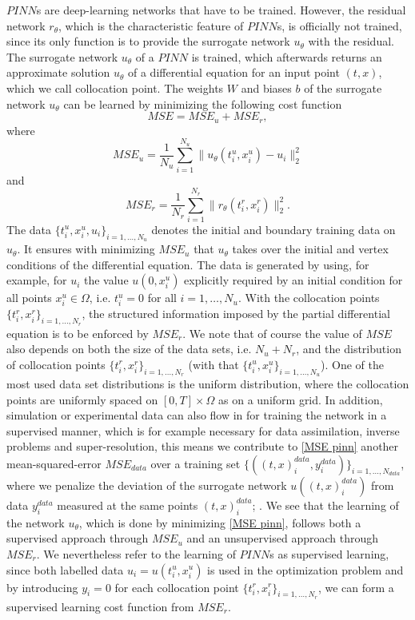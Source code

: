 $PINN$s are deep-learning networks that have to be trained. However, the residual network $r_\theta$, which is the characteristic feature of $PINN$s, is officially not trained, since its only function is to provide the surrogate network $u_\theta$ with the residual. The surrogate network $u_\theta$ of a $PINN$ is trained, which afterwards returns an approximate solution $u_\theta$ of a differential equation for an input point $(t,x)$, which we call collocation point. The weights $W$ and biases $b$ of the surrogate network $u_\theta$ can be learned by minimizing the following cost function
\begin{equation}
    \label{MSE pinn}
    MSE = MSE_u + MSE_r, 
\end{equation}
where
\begin{equation*}
    MSE_u = \frac{1}{N_u} \sum^{N_u}_{i = 1} \lVert u_\theta(t^{u}_i, x^{u}_i) - u_i \rVert^{2}_{2}
\end{equation*}
and
\begin{equation*}
    MSE_r = \frac{1}{N_r} \sum^{N_r}_{i = 1} \lVert r_\theta (t^{r}_i, x^{r}_i) \rVert^{2}_{2}.
\end{equation*}
The data $\{t^{u}_i, x^{u}_i, u_i \}_{i = 1, \ldots, N_u}$ denotes the initial and boundary training data on $u_\theta$. It ensures with minimizing $MSE_u$ that $u_\theta$ takes over the initial and vertex conditions of the differential equation. The data is generated by using, for example, for $u_i$ the value $u(0,x^{u}_i)$ explicitly required by an initial condition for all points $x^{u}_i \in \Omega$, i.e. $t^{u}_i = 0$ for all $i = 1, \ldots, N_u$. With the collocation points $\{t^{r}_i, x^{r}_i \}_{i = 1, \ldots, N_r}$, the structured information imposed by the partial differential equation is to be enforced by $MSE_r$. We note that of course the value of $MSE$ also depends on both the size of the data sets, i.e. $N_u + N_r$, and the distribution of collocation points $\{t^{r}_i, x^{r}_i \}_{i = 1, \ldots, N_r}$ (with that $\{t^{u}_i, x^{u}_i \}_{i = 1, \ldots, N_u}$). One of the most used data set distributions is the uniform distribution, where the collocation points are uniformly spaced on $\left[ 0, T \right] \times \Omega$ as on a uniform grid. In addition, simulation or experimental data can also flow in for training the network in a supervised manner, which is for example necessary for data assimilation, inverse problems and super-resolution, this means we contribute to \cref{MSE pinn} another mean-squared-error $MSE_{data}$ over a training set $\{((t, x)^{data}_i, y^{data}_i) \}_{i = 1, \ldots, N_{data}}$, where we penalize the deviation of the surrogate network $u((t, x)^{data}_i)$ from data $y^{data}_i$ measured at the same points $(t, x)^{data}_i$; \cite[p.~2]{Markidis:2021}. We see that the learning of the network $u_\theta$, which is done by minimizing \cref{MSE pinn}, follows both a supervised approach through $MSE_u$ and an unsupervised approach through $MSE_r$. We nevertheless refer to the learning of $PINN$s as supervised learning, since both labelled data $u_i = u(t^{u}_i, x^{u}_i)$ is used in the optimization problem and by introducing $y_i=0$ for each collocation point $\{t^{r}_i, x^{r}_i \}_{i = 1, \ldots, N_r}$, we can form a supervised learning cost function from $MSE_r$. \\
